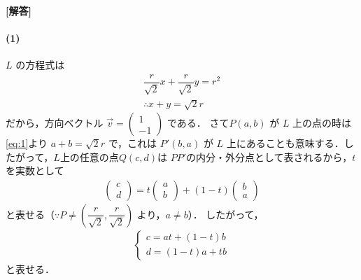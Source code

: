 \documentclass[../../main.tex]{subfiles}
\begin{document}
\begin{oframed}
  
\end{oframed}

{\bf [解答]}
\paragraph{(1)}

$L$ の方程式は
\begin{align}
  \dfrac{r}{\sqrt{2}}x+\dfrac{r}{\sqrt{2}}y=r^2 \\
  \therefore x+y=\sqrt{2}r \label{eq:1}
\end{align}
だから，方向ベクトル $\vec v=
\begin{pmatrix}1\\-1
\end{pmatrix}$ である．
さて$P(a,b)$ が $L$ 上の点の時は\cref{eq:1}より $a+b=\sqrt{2}r$ で，これは $P'(b,a)$ が $L$ 上にあることも意味する．したがって，$L$上の任意の点$Q(c,d)$は $PP'$の内分・外分点として表されるから，$t$ を実数として
\begin{align}
  \begin{pmatrix}c\\d
  \end{pmatrix}=t
  \begin{pmatrix}a\\b
  \end{pmatrix}+(1-t)
  \begin{pmatrix}b\\a
  \end{pmatrix}
\end{align}
と表せる（$\because P\ne\left(\dfrac{r}{\sqrt{2}},\dfrac{r}{\sqrt{2}}\right)$ より，$a\ne b$）．
したがって，
\begin{align}
  \begin{cases}
    c=at+(1-t)b \\
    d=(1-t)a+tb
  \end{cases}
\end{align}
と表せる．
\end{document}
